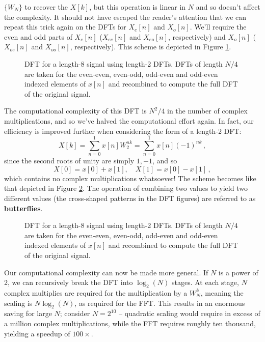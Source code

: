 $\{W_N\}$ to recover the $X[k]$, but this operation is linear in $N$ and so
doesn't affect the complexity. It should not have escaped the reader's attention
that we can repeat this trick again on the DFTs for $X_e[n]$ and $X_o[n]$.
We'll require the even and odd parts of $X_e[n]$ ($X_{ee}[n]$ and $X_{eo}[n]$,
respectively) and $X_o[n]$ ($X_{oe}[n]$ and $X_{oo}[n]$, respectively).
This scheme is depicted in Figure \ref{fig::lecture_11_dft_two}.
%
\begin{figure}[H]
  
  \caption{DFT for a length-8 signal using length-2 DFTs. DFTs of length $N/4$
    are taken for the even-even, even-odd, odd-even and odd-even indexed elements
    of $x[n]$ and recombined to compute the full DFT of the original signal.
  }
  \label{fig::lecture_11_dft_two}
\end{figure}
%
The computational complexity of this DFT is $N^2 / 4$ in the number of complex
multiplications, and so we've halved the computational effort again. In fact,
our efficiency is improved further when considering the form of a length-2 DFT:
%
\begin{displaymath}
  X[k] = \sum_{n=0}^1 x[n]W_2^{nk} = \sum_{n=0}^1 x[n](-1)^{nk} \,,
\end{displaymath}
%
since the second roots of unity are simply $1,-1$, and so
%
\begin{displaymath}
  X[0] = x[0] + x[1],\quad X[1] = x[0] - x[1] \,,
\end{displaymath}
%
which contains no complex multiplications whatsoever! The scheme becomes
like that depicted in Figure \ref{fig::lecture_11_dft_three}. The operation
of combining two values to yield two different values (the cross-shaped patterns
in the DFT figures) are referred to as \textbf{butterflies}.  
%
\begin{figure}[H]
  
  \caption{DFT for a length-8 signal using length-2 DFTs. DFTs of length $N/4$
    are taken for the even-even, even-odd, odd-even and odd-even indexed elements
    of $x[n]$ and recombined to compute the full DFT of the original signal.
  }
  \label{fig::lecture_11_dft_three}
\end{figure}
%
Our computational complexity can now be made more general. If $N$ is a power of 2,
we can recursively break the DFT into $\log_2(N)$ stages. At each stage, $N$ complex
multiplies are required for the multiplication by a $W_N^k$, meaning the scaling is
$N\log_2(N)$, as required for the FFT. This results in an enormous saving for large
$N$; consider $N=2^{10}$ -- quadratic scaling would require in excess of a million
complex multiplications, while the FFT requires roughly ten thousand, yielding a
speedup of $100\times$.\\

